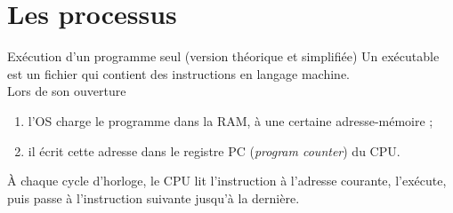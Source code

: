 \documentclass[10pt]{nsibeamer}
\begin{document}
\section{Les processus}
\begin{frame}{Exécution d'un programme seul (version théorique et simplifiée)}\pause
Un \alert{exécutable} est un fichier qui contient des instructions en langage machine.\\\pause
Lors de son ouverture\pause
\begin{enumerate}[--]
	\item l'OS charge le programme dans la RAM, à une certaine adresse-mémoire ;\pause
    \item il écrit cette adresse dans le registre PC (\textit{program counter}) du CPU.\pause
\end{enumerate}
À chaque cycle d'horloge, le CPU lit l'instruction à l'adresse courante, l'exécute, puis passe à l'instruction suivante jusqu'à la dernière.
\end{frame}
\end{document}
